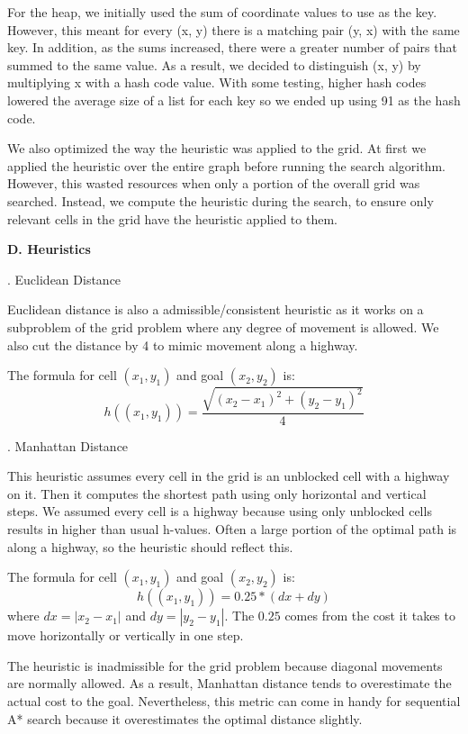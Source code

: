 \documentclass[12pt, letterpaper]{article}
\begin{document}
For the heap, we initially used the sum of coordinate values to use as the key. However, this meant for every (x, y) there is a matching pair (y, x) with the same key. In addition, as the sums increased, there were a greater number of pairs that summed to the same value. As a result, we decided to distinguish (x, y) by multiplying x with a hash code value. With some testing, higher hash codes lowered the average size of a list for each key so we ended up using 91 as the hash code. 

We also optimized the way the heuristic was applied to the grid. At first we applied the heuristic over the entire graph before running the search algorithm. However, this wasted resources when only a portion of the overall grid was searched. Instead, we compute the heuristic during the search, to ensure only relevant cells in the grid have the heuristic applied to them.

\pagebreak %

\noindent \textbf{D. Heuristics}

. Euclidean Distance

Euclidean distance is also a admissible/consistent heuristic as it works on a subproblem of the grid problem where any degree of movement is allowed. We also cut the distance by 4 to mimic movement along a highway.

The formula for cell $(x_1, y_1)$ and goal $(x_2, y_2)$ is:
$$h((x_1,y_1)) = \frac{\sqrt{(x_2-x_1)^2 + (y_2-y_1)^2}}{4}$$

\bigskip
{}. Manhattan Distance

This heuristic assumes every cell in the grid is an unblocked cell with a highway on it. Then it computes the shortest path using only horizontal and vertical steps. We assumed every cell is a highway because using only unblocked cells results in higher than usual h-values. Often a large portion of the optimal path is along a highway, so the heuristic should reflect this.

The formula for cell $(x_1, y_1)$ and goal $(x_2, y_2)$ is:
$$h((x_1, y_1)) = 0.25 * (dx + dy)$$
where $dx = |x_2 - x_1|$ and $dy = |y_2 - y_1|$. The $0.25$ comes from the cost it takes to move horizontally or vertically in one step.

The heuristic is inadmissible for the grid problem because diagonal movements are normally allowed. As a result, Manhattan distance tends to overestimate the actual cost to the goal. Nevertheless, this metric can come in handy for sequential A* search because it overestimates the optimal distance slightly.
\end{document}

